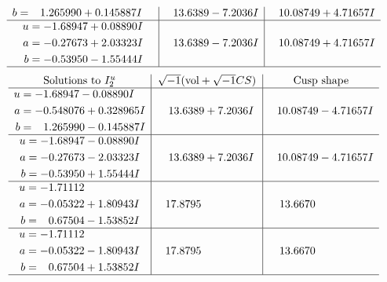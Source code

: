 \documentclass[1p]{elsarticle_modified}
\theoremstyle{definition}
\newcommand{\I}{\sqrt{-1}}
\begin{document}
$$\begin{array}{c|c|c}
\begin{aligned}
b &= \phantom{-}1.265990 + 0.145887 I\end{aligned}
 & \phantom{-}13.6389 - 7.2036 I & \phantom{-}10.08749 + 4.71657 I \\ \hline\begin{aligned}
u &= -1.68947 + 0.08890 I \\
a &= -0.27673 + 2.03323 I \\
b &= -0.53950 - 1.55444 I\end{aligned}
 & \phantom{-}13.6389 - 7.2036 I & \phantom{-}10.08749 + 4.71657 I\\
 \hline 
 \end{array}$$\newpage$$\begin{array}{c|c|c}  
\text{Solutions to }I^u_{2}& \I (\text{vol} + \sqrt{-1}CS) & \text{Cusp shape}\\
 \hline 
\begin{aligned}
u &= -1.68947 - 0.08890 I \\
a &= -0.548076 + 0.328965 I \\
b &= \phantom{-}1.265990 - 0.145887 I\end{aligned}
 & \phantom{-}13.6389 + 7.2036 I & \phantom{-}10.08749 - 4.71657 I \\ \hline\begin{aligned}
u &= -1.68947 - 0.08890 I \\
a &= -0.27673 - 2.03323 I \\
b &= -0.53950 + 1.55444 I\end{aligned}
 & \phantom{-}13.6389 + 7.2036 I & \phantom{-}10.08749 - 4.71657 I \\ \hline\begin{aligned}
u &= -1.71112\phantom{ +0.000000I} \\
a &= -0.05322 + 1.80943 I \\
b &= \phantom{-}0.67504 - 1.53852 I\end{aligned}
 & \phantom{-}17.8795\phantom{ +0.000000I} & \phantom{-}13.6670\phantom{ +0.000000I} \\ \hline\begin{aligned}
u &= -1.71112\phantom{ +0.000000I} \\
a &= -0.05322 - 1.80943 I \\
b &= \phantom{-}0.67504 + 1.53852 I\end{aligned}
 & \phantom{-}17.8795\phantom{ +0.000000I} & \phantom{-}13.6670\phantom{ +0.000000I}\\
 \hline 
 \end{array}$$\newpage\newpage\renewcommand{\arraystretch}{1}
\end{document}
